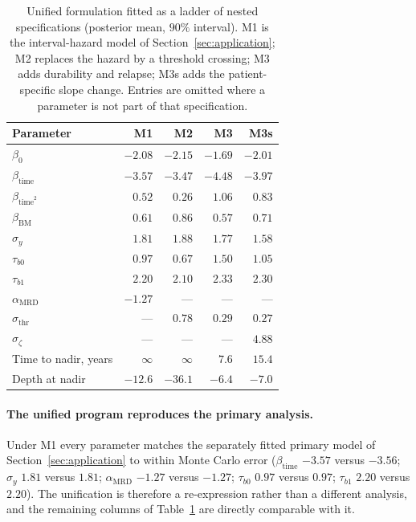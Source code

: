 \documentclass[11pt]{article}
\begin{document}
\begin{table}[!htbp]
\centering
\caption{Unified formulation fitted as a ladder of nested specifications
(posterior mean, $90\%$ interval). M1 is the interval-hazard model of
Section~\ref{sec:application}; M2 replaces the hazard by a threshold crossing;
M3 adds durability and relapse; M3s adds the patient-specific slope change.
Entries are omitted where a parameter is not part of that specification.}
\label{tab:unified}
\small
\begin{tabular}{lrrrr}
\toprule
Parameter & M1 & M2 & M3 & M3s\\
\midrule
$\beta_0$                 & $-2.08$ & $-2.15$ & $-1.69$ & $-2.01$\\
$\beta_{\mathrm{time}}$   & $-3.57$ & $-3.47$ & $-4.48$ & $-3.97$\\
$\beta_{\mathrm{time}^2}$ & $0.52$  & $0.26$  & $1.06$  & $0.83$\\
$\beta_{\mathrm{BM}}$     & $0.61$  & $0.86$  & $0.57$  & $0.71$\\
$\sigma_y$                & $1.81$  & $1.88$  & $1.77$  & $1.58$\\
$\tau_{b0}$               & $0.97$  & $0.67$  & $1.50$  & $1.05$\\
$\tau_{b1}$               & $2.20$  & $2.10$  & $2.33$  & $2.30$\\
$\alpha_{\mathrm{MRD}}$   & $-1.27$ & ---     & ---     & ---\\
$\sigma_{\mathrm{thr}}$   & ---     & $0.78$  & $0.29$  & $0.27$\\
$\sigma_\zeta$            & ---     & ---     & ---     & $4.88$\\
\midrule
Time to nadir, years      & $\infty$ & $\infty$ & $7.6$ & $15.4$\\
Depth at nadir            & $-12.6$ & $-36.1$ & $-6.4$ & $-7.0$\\
\bottomrule
\end{tabular}
\end{table}

\paragraph{The unified program reproduces the primary analysis.}
Under M1 every parameter matches the separately fitted primary model of
Section~\ref{sec:application} to within Monte Carlo error
($\beta_{\mathrm{time}}$ $-3.57$ versus $-3.56$; $\sigma_y$ $1.81$ versus
$1.81$; $\alpha_{\mathrm{MRD}}$ $-1.27$ versus $-1.27$; $\tau_{b0}$ $0.97$
versus $0.97$; $\tau_{b1}$ $2.20$ versus $2.20$). The unification is therefore
a re-expression rather than a different analysis, and the remaining columns of
Table~\ref{tab:unified} are directly comparable with it.
\end{document}

